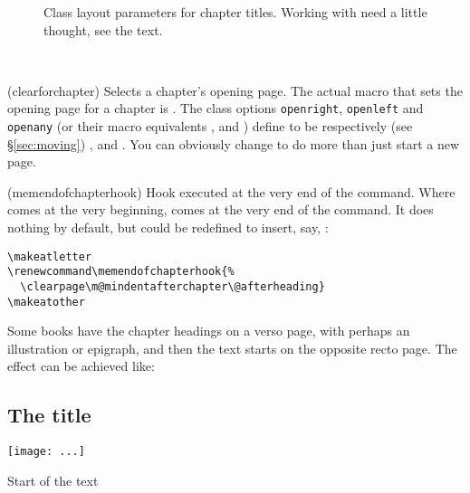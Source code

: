 \begin{figure}
\centering
\chapterdiagram
\caption{Class layout parameters for chapter titles. Working with
   need a little thought, see the text.}
\label{lay:chap}
\end{figure}

\begin{syntax}
\cmd{\clearforchapter} \\
\end{syntax}
\glossary(clearforchapter)%
  {}%
  {Selects a chapter's opening page.}
The actual macro that sets the opening page for a chapter is
\cmd{\clearforchapter}. The class options \texttt{openright},
\texttt{openleft} and \texttt{openany} (or their macro equivalents
\cmd{\openright}, \cmd{\openleft} and
\cmd{\openany}) define \cmd{\clearforchapter} to be respectively
(see \S\ref{sec:moving})
\cmd{\cleartorecto}, \cmd{\cleartoverso} and \cmd{\clearpage}. You can
obviously change \cmd{\clearforchapter} to do more than just start a
new page.

\begin{syntax}
\cmd{\memendofchapterhook}
\end{syntax}
\glossary(memendofchapterhook)%
  {}%
  {Hook executed at the very end of the  command.}
Where \cmd{\clearforchapter} comes at the very beginning,
\cmd{\memendofchapterhook} comes at the very end of the \cmd{\chapter}
command. It does nothing by default, but could be redefined to insert,
say, \cmd{\clearpage}:
\begin{verbatim}
\makeatletter
\renewcommand\memendofchapterhook{%
  \clearpage\m@mindentafterchapter\@afterheading}
\makeatother
\end{verbatim}


    Some books have the chapter headings on a verso page, with perhaps
an illustration or epigraph, and
then the text starts on the opposite
recto page. The effect can be achieved like:
\begin{lcode}
\openleft                %
\chapter{The title}      %
\begin{centering}        %
\texttt{[image: ...]}
\end{centering}
\clearpage               %
Start of the text        %
\end{lcode}


